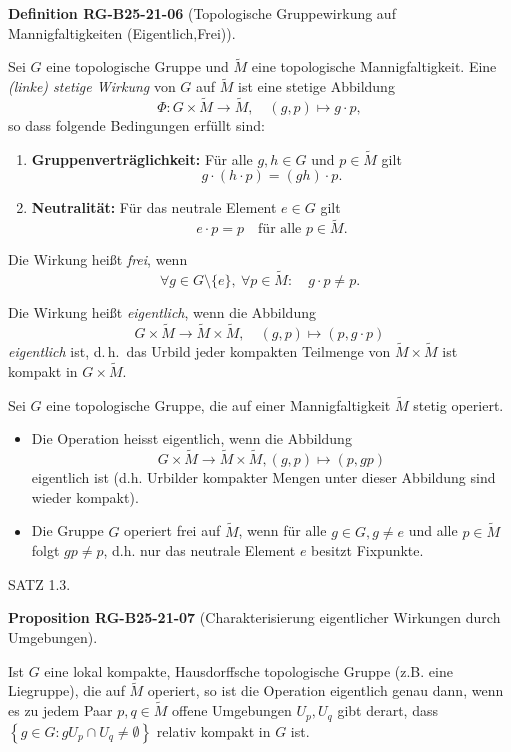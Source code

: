 \documentclass[10pt, letterpaper]{article}
\newcommand{\CustomHeading}[3]{%
  \par\medskip\noindent%
  \textbf{#1 #2} \textnormal{(#3)}.\enskip%
}
\newenvironment{DEF}[2]{\begin{unitbox}\CustomHeading{Definition}{#1}{#2}}{\end{unitbox}}
\newenvironment{PROP}[2]{\begin{unitbox}\CustomHeading{Proposition}{#1}{#2}}{\end{unitbox}}
\begin{document}
\begin{DEF}{RG-B25-21-06}{Topologische Gruppewirkung auf Mannigfaltigkeiten (Eigentlich,Frei)}
Sei $G$ eine topologische Gruppe und $\tilde{M}$ eine topologische Mannigfaltigkeit. Eine \emph{(linke) stetige Wirkung} von $G$ auf $\tilde{M}$ ist eine stetige Abbildung
\[
\Phi : G \times \tilde{M} \to \tilde{M}, \quad (g, p) \mapsto g \cdot p,
\]
so dass folgende Bedingungen erfüllt sind:
\begin{enumerate}
  \item \textbf{Gruppenverträglichkeit:} Für alle $g, h \in G$ und $p \in \tilde{M}$ gilt
  \[
  g \cdot (h \cdot p) = (gh) \cdot p.
  \]
  
  \item \textbf{Neutralität:} Für das neutrale Element $e \in G$ gilt
  \[
  e \cdot p = p \quad \text{für alle } p \in \tilde{M}.
  \]
\end{enumerate}

Die Wirkung heißt \emph{frei}, wenn
\[
\forall g \in G \setminus \{e\},\ \forall p \in \tilde{M}: \quad g \cdot p \neq p.
\]

Die Wirkung heißt \emph{eigentlich}, wenn die Abbildung
\[
G \times \tilde{M} \to \tilde{M} \times \tilde{M}, \quad (g, p) \mapsto (p, g \cdot p)
\]
\emph{eigentlich} ist, d.\,h.\ das Urbild jeder kompakten Teilmenge von $\tilde{M} \times \tilde{M}$ ist kompakt in $G \times \tilde{M}$.
\end{DEF}



Sei $G$ eine topologische Gruppe, die auf einer Mannigfaltigkeit $\tilde{M}$ stetig operiert.
\begin{itemize}
  \item Die Operation heisst eigentlich, wenn die Abbildung 
  $$G \times \tilde{M} \rightarrow \tilde{M} \times \tilde{M},(g, p) \mapsto(p, g p)$$ eigentlich ist (d.h. Urbilder kompakter Mengen unter dieser Abbildung sind wieder kompakt).
  \item Die Gruppe $G$ operiert frei auf $\tilde{M}$, wenn für alle $g \in G, g \neq e$ und alle $p \in \tilde{M}$ folgt $g p \neq p$, d.h. nur das neutrale Element $e$ besitzt Fixpunkte.
\end{itemize}



SATZ 1.3. 

\begin{PROP}{RG-B25-21-07}{Charakterisierung eigentlicher Wirkungen durch Umgebungen}
Ist $G$ eine lokal kompakte, Hausdorffsche topologische Gruppe (z.B. eine Liegruppe), die auf $\tilde{M}$ operiert, so ist die Operation eigentlich genau dann, wenn es zu jedem Paar $p, q \in \tilde{M}$ offene Umgebungen $U_{p}, U_{q}$ gibt derart, dass $\left\{g \in G: g U_{p} \cap U_{q} \neq \emptyset\right\}$ relativ kompakt in $G$ ist.
\end{PROP}
\end{document}
